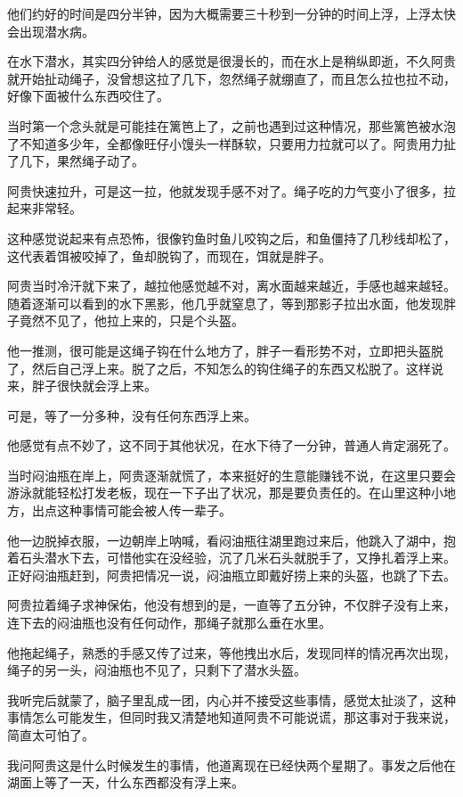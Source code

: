 他们约好的时间是四分半钟，因为大概需要三十秒到一分钟的时间上浮，上浮太快会出现潜水病。

在水下潜水，其实四分钟给人的感觉是很漫长的，而在水上是稍纵即逝，不久阿贵就开始扯动绳子，没曾想这拉了几下，忽然绳子就绷直了，而且怎么拉也拉不动，好像下面被什么东西咬住了。

当时第一个念头就是可能挂在篱笆上了，之前也遇到过这种情况，那些篱笆被水泡了不知道多少年，全都像旺仔小馒头一样酥软，只要用力拉就可以了。阿贵用力扯了几下，果然绳子动了。

阿贵快速拉升，可是这一拉，他就发现手感不对了。绳子吃的力气变小了很多，拉起来非常轻。

这种感觉说起来有点恐怖，很像钓鱼时鱼儿咬钩之后，和鱼僵持了几秒线却松了，这代表着饵被咬掉了，鱼却脱钩了，而现在，饵就是胖子。

阿贵当时冷汗就下来了，越拉他感觉越不对，离水面越来越近，手感也越来越轻。随着逐渐可以看到的水下黑影，他几乎就窒息了，等到那影子拉出水面，他发现胖子竟然不见了，他拉上来的，只是个头盔。

他一推测，很可能是这绳子钩在什么地方了，胖子一看形势不对，立即把头盔脱了，然后自己浮上来。脱了之后，不知怎么的钩住绳子的东西又松脱了。这样说来，胖子很快就会浮上来。

可是，等了一分多种，没有任何东西浮上来。

他感觉有点不妙了，这不同于其他状况，在水下待了一分钟，普通人肯定溺死了。

当时闷油瓶在岸上，阿贵逐渐就慌了，本来挺好的生意能赚钱不说，在这里只要会游泳就能轻松打发老板，现在一下子出了状况，那是要负责任的。在山里这种小地方，出点这种事情可能会被人传一辈子。

他一边脱掉衣服，一边朝岸上呐喊，看闷油瓶往湖里跑过来后，他跳入了湖中，抱着石头潜水下去，可惜他实在没经验，沉了几米石头就脱手了，又挣扎着浮上来。正好闷油瓶赶到，阿贵把情况一说，闷油瓶立即戴好捞上来的头盔，也跳了下去。

阿贵拉着绳子求神保佑，他没有想到的是，一直等了五分钟，不仅胖子没有上来，连下去的闷油瓶也没有任何动作，那绳子就那么垂在水里。

他拖起绳子，熟悉的手感又传了过来，等他拽出水后，发现同样的情况再次出现，绳子的另一头，闷油瓶也不见了，只剩下了潜水头盔。

我听完后就蒙了，脑子里乱成一团，内心并不接受这些事情，感觉太扯淡了，这种事情怎么可能发生，但同时我又清楚地知道阿贵不可能说谎，那这事对于我来说，简直太可怕了。

我问阿贵这是什么时候发生的事情，他道离现在已经快两个星期了。事发之后他在湖面上等了一天，什么东西都没有浮上来。

